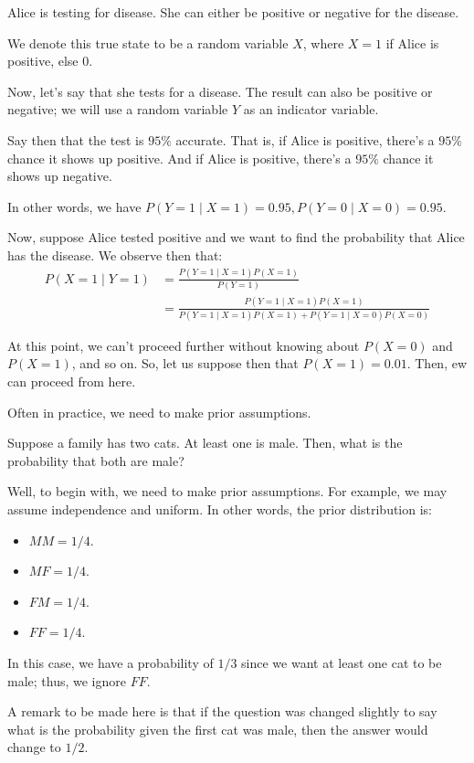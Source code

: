 \documentclass[openany]{book}
\begin{document}
\begin{example}
	Alice is testing for disease. She can either be positive or negative for the disease.
	
	We denote this true state to be a random variable $X$, where $X = 1$ if Alice is positive, else $0$.
	
	Now, let's say that she tests for a disease. The result can also be positive or negative; we will use a random variable $Y$ as an indicator variable.
	
	Say then that the test is $95\%$ accurate. That is, if Alice is positive, there's a $95\%$ chance it shows up positive. And if Alice is positive, there's a $95\%$ chance it shows up negative.
	
	In other words, we have $P(Y = 1 \mid X = 1) = 0.95, P(Y = 0 \mid X = 0) = 0.95$.
	
	Now, suppose Alice tested positive and we want to find the probability that Alice has the disease. We observe then that:
	\begin{align*}
		P(X = 1 \mid Y = 1) &= \frac{P(Y = 1 \mid X = 1)P(X = 1)}{P(Y = 1)} \\
		&= \frac{P(Y = 1 \mid X = 1)P(X = 1)}{P(Y = 1 \mid X = 1)P(X = 1) + P(Y = 1 \mid X = 0)P(X = 0)}
	\end{align*}
	
	At this point, we can't proceed further without knowing about $P(X = 0)$ and $P(X = 1)$, and so on. So, let us suppose then that $P(X = 1) = 0.01$. Then, ew can proceed from here.
\end{example}

\begin{rmk}
	Often in practice, we need to make prior assumptions.
\end{rmk}

\begin{example}
	Suppose a family has two cats. At least one is male. Then, what is the probability that both are male?
	
	Well, to begin with, we need to make prior assumptions. For example, we may assume independence and uniform. In other words, the prior distribution is:
	\begin{itemize}
		\item $MM = 1/4$.
		\item $MF = 1/4$.
		\item $FM = 1/4$.
		\item $FF = 1/4$.
	\end{itemize}
	
	In this case, we have a probability of $1/3$ since we want at least one cat to be male; thus, we ignore $FF$.
	
	A remark to be made here is that if the question was changed slightly to say what is the probability given the first cat was male, then the answer would change to $1/2$.
\end{example}
\end{document}
